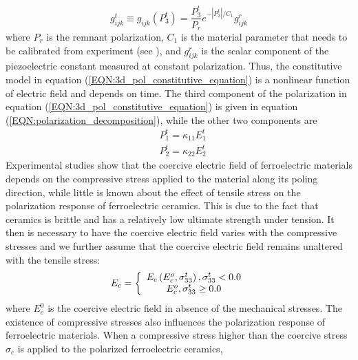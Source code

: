\begin{equation}
g_{ijk}^t \equiv {g_{ijk}}(P_3^t) = \frac{{P_3^t}}{{{P_r}}}{e^{ - \left| {P_3^t} \right|/{C_1}}}g_{ijk}^r
\label{EQN:3d_piezo_electric_comstant_g}
\end{equation}
where $P_r$ is the remnant polarization, $C_1$ is the material parameter that needs to be calibrated from experiment (see \cite{Muliana2011}), and $g_{ijk}^r$ is the scalar component of the piezoelectric constant measured at constant polarization. 
 Thus, the constitutive model in equation (\ref{EQN:3d_pol_constitutive_equation}) is a nonlinear function of electric field and depends on time. 
 The third component of the polarization  in equation (\ref{EQN:3d_pol_constitutive_equation}) is given in equation (\ref{EQN:polarization_decomposition}),
  while the other two components are 
\begin{equation}
\begin{aligned}
& P_1^t = {\kappa _{11}}E_1^t \\
& P_2^t = {\kappa _{22}}E_2^t
\end{aligned}
\label{EQN:other_components_of_pr} 
\end{equation}  
Experimental studies show that the coercive electric field of ferroelectric materials depends on the compressive stress applied to the material along its poling direction,
 while little is known about the effect of tensile stress on the polarization response of ferroelectric ceramics. 
 This is due to the fact that ceramics is brittle and has a relatively low ultimate strength under tension. 
 It then is necessary to have the coercive electric field varies with the compressive stresses and we further assume that the coercive electric field remains unaltered with the tensile stress:
\begin{equation}
\begin{aligned}
{E_c} = \left\{ {\begin{array}{*{20}{c}}
{{E_c}\left( {E_c^o,\sigma _{33}^t} \right),{\rm{  }}\sigma _{33}^t < 0.0}\\
{E_c^o,{\rm{                   }}\sigma _{33}^t \ge 0.0}
\end{array}} \right.
\end{aligned}
\label{EQN:Effect_of_tensile_stress}
\end{equation}  
where $E^0_c$ is the coercive electric field in absence of the mechanical stresses.
The existence of compressive stresses also influences the polarization response of ferroelectric materials. 
When a compressive stress higher than the coercive stress $\sigma_c$ is applied to the polarized ferroelectric ceramics,
